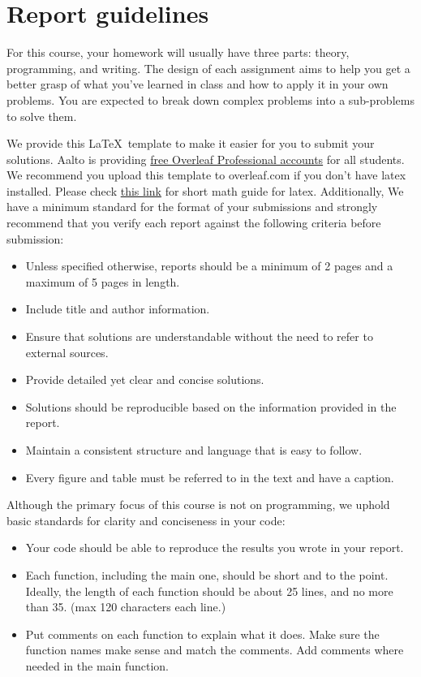 \section{Report guidelines}

For this course, your homework will usually have three parts: theory, programming, and writing. The design of each assignment aims to help you get a better grasp of what you've learned in class and how to apply it in your own problems.
You are expected to break down complex problems into a sub-problems to solve them. 

We provide this \LaTeX \ template to make it easier for you to submit your solutions. Aalto is providing \href{https://www.aalto.fi/en/services/aalto-university-on-overleaf}{free Overleaf Professional accounts} for all students. We recommend you upload this template to overleaf.com if you don't have latex installed. Please check \href{https://tug.ctan.org/info/short-math-guide/short-math-guide.pdf}{this link} for short math guide for latex.
Additionally, We have a minimum standard for the format of your submissions and strongly recommend that you verify each report against the following criteria before submission:

\begin{itemize}
    \item Unless specified otherwise, reports should be a minimum of 2 pages and a maximum of 5 pages in length.
    \item Include title and author information.
    \item Ensure that solutions are understandable without the need to refer to external sources.
    \item Provide detailed yet clear and concise solutions.
    \item Solutions should be reproducible based on the information provided in the report.
    \item Maintain a consistent structure and language that is easy to follow.
    \item Every figure and table must be referred to in the text and have a caption.
\end{itemize}

Although the primary focus of this course is not on programming, we uphold basic standards for clarity and conciseness in your code:

\begin{itemize}
    \item Your code should be able to reproduce the results you wrote in your report.
    \item Each function, including the main one, should be short and to the point. Ideally, the length of each function should be about 25 lines, and no more than 35. (max 120 characters each line.)
    \item Put comments on each function to explain what it does. Make sure the function names make sense and match the comments. Add comments where needed in the main function.
\end{itemize}

